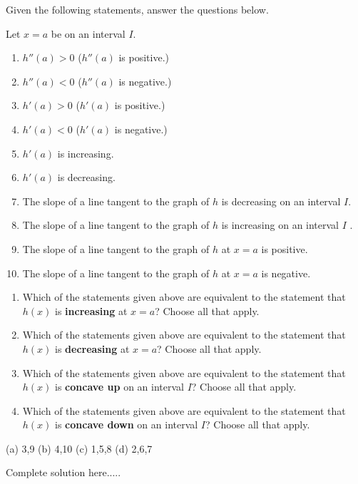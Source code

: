 \begin{example}
Given the following statements, answer the questions below.
\begin{tcolorbox}[colback=white,boxrule=0.15mm]
Let $x=a$ be on an interval $I$.
\begin{multicols}{2}
\begin{enumerate}[leftmargin=*]
    \item $h''(a)>0$ ($h''(a)$ is positive.)
     \item $h''(a)<0$ ($h''(a)$ is negative.)
    \item $h'(a)>0$ ($h'(a)$ is positive.)
    \item $h'(a)<0$ ($h'(a)$ is negative.)
    \item $h'(a)$ is increasing.
    \item $h'(a)$ is decreasing.
    \item The slope of a line tangent to the graph of $h$ is decreasing on an interval $I$.
    \item The slope of a line tangent to the graph of $h$ is increasing on an interval $I$ .
    \item The slope of a line tangent to the graph of $h$ at $x=a$ is positive.
    \item The slope of a line tangent to the graph of $h$ at $x=a$ is negative.
\end{enumerate}
\end{multicols}
\end{tcolorbox}


\renewcommand{\labelenumi}{(\alph{enumi})}
\begin{enumerate}
    \item Which of the statements given above are equivalent to the statement that $h(x)$ is \textbf{increasing} at $x=a$? Choose all that apply.
    \item Which of the statements given above are equivalent to the statement that $h(x)$ is \textbf{decreasing} at $x=a$? Choose all that apply.
    \item Which of the statements given above are equivalent to the statement that $h(x)$ is \textbf{concave up} on an interval $I$? Choose all that apply.
    \item Which of the statements given above are equivalent to the statement that $h(x)$ is \textbf{concave down} on an interval $I$? Choose all that apply.
\end{enumerate}

    \begin{sol}
    (a) 3,9 (b) 4,10 (c) 1,5,8 (d) 2,6,7
    \end{sol}
    \begin{solL}
    Complete solution here.....
    
    \end{solL}
    
\end{example}

